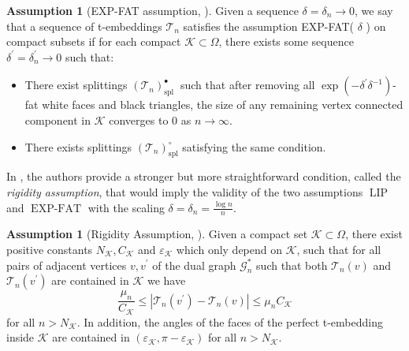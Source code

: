 \documentclass[12pt]{amsart}
\numberwithin{equation}{section}
\theoremstyle{definition}
\newtheorem{assumption}[thm]{Assumption}
\begin{document}
\begin{assumption}[EXP-FAT assumption, \cite{MR4588721}]
    \label{assumption:exp-fat}
    Given a sequence $\delta=\delta_n \rightarrow 0$, we say that a sequence of t-embeddings $\mathcal{T}_n$ satisfies the assumption EXP-FAT( $\delta$ ) on compact subsets if for each compact $\mathcal{K} \subset \Omega$, there exists some sequence $\delta^{\prime}=\delta_n^{\prime} \rightarrow 0$ such that:
    \begin{itemize}
        \item There exist splittings $\left(\mathcal{T}_n\right)_{\text {spl }}^{\bullet}$ such that after removing all $\exp \left(-\delta^{\prime} \delta^{-1}\right)$-fat white faces and black triangles, the size of any remaining vertex connected component in $\mathcal{K}$ converges to 0 as $n \rightarrow \infty$.
        \item There exists splittings $\left(\mathcal{T}_n\right)_{\mathrm{spl}}^{\circ}$ satisfying the same condition.
    \end{itemize}
\end{assumption}

In \cite{tower_AD_perfect}, the authors provide a stronger but more straightforward condition, called the \emph{rigidity assumption}, that would imply the validity of the two assumptions $\operatorname{LIP}$ and $\operatorname{EXP-FAT}$ with the scaling $\delta=\delta_n=\frac{\log n}{n}$.  

\begin{assumption}[Rigidity Assumption, \cite{tower_AD_perfect}]
    \label{assumption: Rigidity}
   Given a compact set $\mathcal{K} \subset \Omega$, there exist positive constants $N_{\mathcal{K}}, C_{\mathcal{K}}$ and $\varepsilon_{\mathcal{K}}$ which only depend on $\mathcal{K}$, such that for all pairs of adjacent vertices $v, v^{\prime}$ of the dual graph $\mathcal{G}_n^*$ such that both $\mathcal{T}_n(v)$ and $\mathcal{T}_n\left(v^{\prime}\right)$ are contained in $\mathcal{K}$ we have
$$
\frac{\mu_n}{C_{\mathcal{K}}} \leq\left|\mathcal{T}_n\left(v^{\prime}\right)-\mathcal{T}_n(v)\right| \leq \mu_n C_{\mathcal{K}}
$$
for all $n>N_{\mathcal{K}}$. In addition, the angles of the faces of the perfect t-embedding inside $\mathcal{K}$ are contained in $\left(\varepsilon_{\mathcal{K}}, \pi-\varepsilon_{\mathcal{K}}\right)$ for all $n>N_{\mathcal{K}}$.
\end{assumption}
\end{document}
